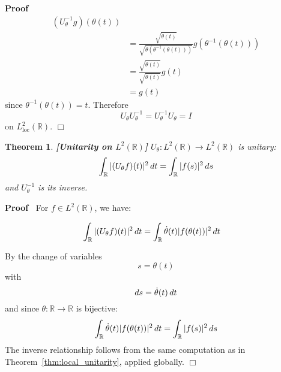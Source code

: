 \documentclass{article}
\newcommand{\tmop}[1]{\ensuremath{\operatorname{#1}}}
\newcommand{\tmstrong}[1]{\textbf{#1}}
\newenvironment{proof}{\noindent\textbf{Proof\ }}{\hspace*{\fill}$\Box$\medskip}
\newtheorem{theorem}{Theorem}
\begin{document}
\begin{proof}
\begin{equation}
\begin{array}{ll}
      (U_{\theta}^{- 1} g) (\theta (t))\\
      & = \frac{\sqrt{\dot{\theta} (t)}}{\sqrt{\dot{\theta} (\theta^{- 1}
      (\theta (t)))}} g (\theta^{- 1} (\theta (t)))\\
      & = \frac{\sqrt{\dot{\theta} (t)}}{\sqrt{\dot{\theta} (t)}} g (t)\\
      & = g (t)
    \end{array}
  \end{equation}
  since $\theta^{- 1} (\theta (t)) = t$. Therefore
  \begin{equation}
    U_{\theta} U_{\theta}^{- 1} = U_{\theta}^{- 1} U_{\theta} = I
  \end{equation}
  on $L^2_{\tmop{loc}} (\mathbb{R})$.
\end{proof}

\begin{theorem}
  {\tmstrong{[Unitarity on $L^2 (\mathbb{R})$]\label{thm:global_unitarity}}}
  $U_{\theta} : L^2 (\mathbb{R}) \to L^2 (\mathbb{R})$ is unitary:
  \begin{equation}
    \int_{\mathbb{R}} | (U_{\theta} f) (t) |^2 \hspace{0.17em} dt =
    \int_{\mathbb{R}} |f (s) |^2  \hspace{0.17em} ds
  \end{equation}
  and $U_{\theta}^{- 1}$ is its inverse.
\end{theorem}

\begin{proof}
  For $f \in L^2 (\mathbb{R})$, we have:
  
  \begin{align}
    \int_{\mathbb{R}} | (U_{\theta} f) (t) |^2  \hspace{0.17em} dt & =
    \int_{\mathbb{R}} \dot{\theta} (t) |f (\theta (t)) |^2  \hspace{0.17em} dt
    
  \end{align}
  
  By the change of variables
  \begin{equation}
    s = \theta (t)
  \end{equation}
  with
  \begin{equation}
    ds = \dot{\theta} (t)  \hspace{0.17em} dt
  \end{equation}
  and since $\theta : \mathbb{R} \to \mathbb{R}$ is bijective:
  \begin{equation}
    \int_{\mathbb{R}} \dot{\theta} (t)  |f (\theta (t)) |^2 \hspace{0.17em} dt
    = \int_{\mathbb{R}} |f (s) |^2  \hspace{0.17em} ds
  \end{equation}
  The inverse relationship follows from the same computation as in
  Theorem~\ref{thm:local_unitarity}, applied globally.
\end{proof}
\end{document}
